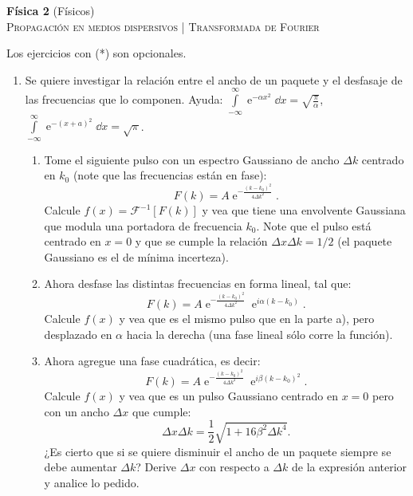 \documentclass[11pt,spanish,a4paper]{article}
\begin{document}
\begin{center}
\textbf{Física 2} (Físicos) \hfill {}\\
	\textsc{\LARGE Propagación en medios dispersivos | Transformada de Fourier}
\end{center}

Los ejercicios con (*) son opcionales.

\begin{enumerate}

								
\section*{Transformada de Fourier}

\item Se quiere investigar la relación entre el ancho de un paquete y el desfasaje de las frecuencias que lo componen.
Ayuda: \( \int\limits_{-\infty}^{\infty} \operatorname{e}^{-\alpha x^2} \dd{x} = \sqrt{\frac{\pi}{\alpha} } \), \( \int\limits_{-\infty}^{\infty} \operatorname{e}^{-(x+ a)^2} \dd{x} = \sqrt{\pi}\).
\begin{enumerate}
	\item Tome el siguiente pulso con un espectro Gaussiano de ancho $\Delta k$ centrado en $k_0$ (note que las frecuencias están en fase):
$$
F(k)=A \operatorname{e}^{-\frac{ ( k - k_0 )^2 }{ 4 \Delta k^2 } }.
$$
Calcule $f(x) = \mathcal{F}^{-1}[F(k)]$ y vea que tiene una envolvente Gaussiana que modula una portadora de frecuencia $k_{0}$.
Note que el pulso está centrado en $x=0$ y que se cumple la relación $\Delta x \Delta k = 1/2$ (el paquete Gaussiano es el de mínima incerteza).
	\item Ahora desfase las distintas frecuencias en forma lineal, tal que:
$$
F(k)=A \operatorname{e}^{ -\frac{ ( k - k_0 )^2 }{ 4 \Delta k^2 } } \operatorname{e}^{ i \alpha (k - k_0 ) }.
$$
Calcule $f(x)$ y vea que es el mismo pulso que en la parte a), pero desplazado en $\alpha$ hacia la derecha (una fase lineal sólo corre la función).
	\item Ahora agregue una fase cuadrática, es decir:
$$
F(k) = A \operatorname{e}^{-\frac{(k-k_{0})^{2}}{4\Delta k^{2}} } \operatorname{e}^{i \beta ( k - k_0 )^2 }.
$$
Calcule $f(x)$ y vea que es un pulso Gaussiano centrado en $x=0$ pero con un ancho $\Delta x$ que cumple:
$$
\Delta x \Delta k = \frac{1}{2} \sqrt{ 1 + 16 \beta^2 \Delta k^4 }.
$$
¿Es cierto que si se quiere disminuir el ancho de un paquete siempre se debe aumentar $\Delta k$?
Derive $\Delta x$ con respecto a $\Delta k$ de la expresión anterior y analice lo pedido.
\end{enumerate}



\end{enumerate}
\end{document}

